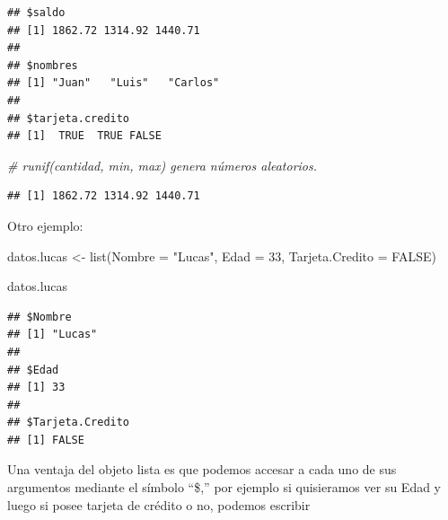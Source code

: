 \documentclass[
  12pt,
]{book}
\newenvironment{Shaded}{\begin{snugshade}}{\end{snugshade}}
\newcommand{\AttributeTok}[1]{\textcolor[rgb]{0.77,0.63,0.00}{#1}}
\newcommand{\CommentTok}[1]{\textcolor[rgb]{0.56,0.35,0.01}{\textit{#1}}}
\newcommand{\ConstantTok}[1]{\textcolor[rgb]{0.00,0.00,0.00}{#1}}
\newcommand{\DecValTok}[1]{\textcolor[rgb]{0.00,0.00,0.81}{#1}}
\newcommand{\FunctionTok}[1]{\textcolor[rgb]{0.00,0.00,0.00}{#1}}
\newcommand{\NormalTok}[1]{#1}
\newcommand{\OtherTok}[1]{\textcolor[rgb]{0.56,0.35,0.01}{#1}}
\newcommand{\SpecialCharTok}[1]{\textcolor[rgb]{0.00,0.00,0.00}{#1}}
\newcommand{\StringTok}[1]{\textcolor[rgb]{0.31,0.60,0.02}{#1}}
\begin{document}
\begin{verbatim}
## $saldo
## [1] 1862.72 1314.92 1440.71
## 
## $nombres
## [1] "Juan"   "Luis"   "Carlos"
## 
## $tarjeta.credito
## [1]  TRUE  TRUE FALSE
\end{verbatim}

\begin{Shaded}
\begin{Highlighting}[]
\CommentTok{\# runif(cantidad, min, max) genera números aleatorios.}
\end{Highlighting}
\end{Shaded}

\begin{Shaded}
\end{Shaded}

\begin{verbatim}
## [1] 1862.72 1314.92 1440.71
\end{verbatim}

Otro ejemplo:

\begin{Shaded}
\begin{Highlighting}[]
\NormalTok{datos.lucas }\OtherTok{\textless{}{-}} \FunctionTok{list}\NormalTok{(}\AttributeTok{Nombre =} \StringTok{"Lucas"}\NormalTok{, }\AttributeTok{Edad =} \DecValTok{33}\NormalTok{, }\AttributeTok{Tarjeta.Credito =} \ConstantTok{FALSE}\NormalTok{)}

\NormalTok{datos.lucas}
\end{Highlighting}
\end{Shaded}

\begin{verbatim}
## $Nombre
## [1] "Lucas"
## 
## $Edad
## [1] 33
## 
## $Tarjeta.Credito
## [1] FALSE
\end{verbatim}

Una ventaja del objeto lista es que podemos accesar a cada uno de sus argumentos mediante el símbolo ``\$,'' por ejemplo si quisieramos ver su Edad y luego si posee tarjeta de crédito o no, podemos escribir

\begin{Shaded}
\end{Shaded}
\end{document}
